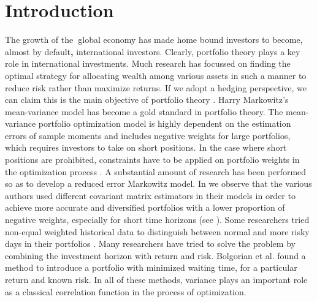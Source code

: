 \documentclass[journal,article,submit,moreauthors,pdftex]{Definitions/mdpi}
\begin{document}


\section{Introduction}

The growth of the\textbf{\ }global economy has made home bound investors to
become, almost by default\textbf{, }international investors. Clearly,
portfolio theory plays a key role in international investments. Much
research has focussed on finding the optimal strategy for allocating wealth
among various assets in such a manner to reduce risk rather than maximize
returns. If we adopt a hedging perspective, we can claim this is the main
objective of portfolio theory \cite{Jorion}. Harry Markowitz's mean-variance
model \cite{Mark1}\cite{Mark2} has become a gold standard in portfolio
theory. The mean-variance portfolio optimization model is highly dependent
on the estimation errors of sample moments and includes negative weights for
large portfolios, which requires investors to take on short positions. In
the case where short positions are prohibited, constraints have to be
applied on portfolio weights in the optimization process \cite{Best}\cite%
{Green}\cite{Jagannathan}. A substantial amount of research has been
performed so as to develop a reduced error Markowitz model. In \cite{Ledoit,Laloux,Plerou,Rosenow,Potters, Anderberg}we
observe that the various authors used different covariant matrix estimators
in their models in order to achieve more accurate and diversified portfolios
with a lower proportion of negative weights, especially for short time
horizons (see \cite{Kondor}\cite{Pafka}). Some researchers tried non-equal
weighted historical data to distinguish between normal and more risky days
in their portfolios \cite{Coelho}. Many researchers have tried to solve the
problem by combining the investment horizon with return and risk. Bolgorian
et al.\cite{Bolgorian} found a method to introduce a portfolio with
minimized waiting time, for a particular return and known risk. In all of
these methods, variance plays an important role as a classical correlation
function in the process of optimization.
\end{document}
